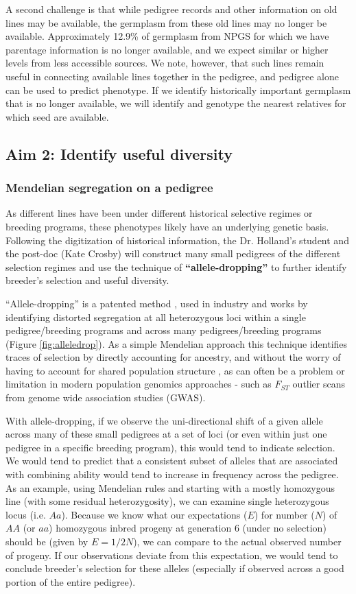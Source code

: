 \documentclass[12pt]{article}
\begin{document}
A second challenge is that while pedigree records and other information on old lines may be available, the germplasm from these old lines may no longer be available. 
Approximately 12.9\% of germplasm from NPGS for which we have parentage information is no longer available, and we expect similar or higher levels from less accessible sources. 
We note, however, that such lines remain useful in connecting available lines together in the pedigree, and pedigree alone can be used to predict phenotype. 
If we identify historically important germplasm that is no longer available, we will identify and genotype the nearest relatives for which seed are available. 

\subsection*{Aim 2: Identify useful diversity}

\subsubsection*{Mendelian segregation on a pedigree}
As different lines have been under different historical selective regimes or breeding programs, these phenotypes likely have an underlying genetic basis. Following the digitization of historical information, the Dr. Holland's student and the post-doc (Kate Crosby) will construct many small pedigrees of the different selection regimes and use the technique of \textbf{``allele-dropping''} to further identify breeder's selection and useful diversity. 

``Allele-dropping'' is a patented method \citep{sebastian1995method}, used in industry and works by identifying distorted segregation at all heterozygous loci within a single pedigree/breeding programs and across many pedigrees/breeding programs (Figure \ref{fig:alleledrop}). 
As a simple Mendelian approach this technique identifies traces of selection by directly accounting for ancestry, and without the worry of having to account for shared population structure \cite{sebastian1995method}, as can often be a problem or limitation in modern population genomics approaches - such as $F_{ST}$ outlier scans from genome wide association studies (GWAS). 

With allele-dropping, if we observe the uni-directional shift of a given allele across many of these small pedigrees at a set of loci (or even within just one pedigree in a specific breeding program), this would tend to indicate selection. 
We would tend to predict that a consistent subset of alleles that are associated with combining ability would tend to increase in frequency across the pedigree.
As an example, using Mendelian rules and starting with a mostly homozygous line (with some residual heterozygosity), we can examine single heterozygous locus (i.e. $Aa$). 
Because we know what our expectations ($E$) for number ($N$) of $AA$ (or $aa$) homozygous inbred progeny at generation 6 (under no selection) should be (given by $E = 1/2 N$), we can compare to the actual observed number of progeny. 
If our observations deviate from this expectation, we would tend to conclude breeder's selection for these alleles (especially if observed across a good portion of the entire pedigree). 
\end{document}
